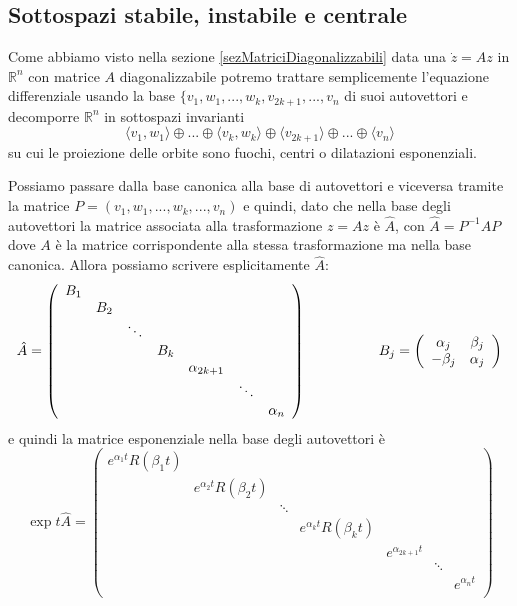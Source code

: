 \documentclass[11pt,a4paper,twoside]{book}
\theoremstyle{esss}
\theoremstyle{dotless}
\numberwithin{equation}{section} %
\begin{document}
\subsection{Sottospazi stabile, instabile e centrale}
Come abbiamo visto nella sezione \ref{sezMatriciDiagonalizzabili} data una $\dot{z}=Az$ in $\mathbb{R}^n$ con matrice $A$ diagonalizzabile potremo trattare semplicemente l'equazione differenziale usando la base $\{v_1,w_1,...,w_k,v_{2k+1},...,v_n$ di suoi autovettori e decomporre $\mathbb{R}^n$ in sottospazi invarianti
\[
\langle v_1,w_1 \rangle \oplus ... \oplus \langle v_k,w_k \rangle \oplus \langle v_{2k+1} \rangle \oplus ... \oplus \langle v_n \rangle
\]
su cui le proiezione delle orbite sono fuochi, centri o dilatazioni esponenziali.

Possiamo passare dalla base canonica alla base di autovettori e viceversa tramite la matrice $P=(v_1,w_1,...,w_k,...,v_n)$ e quindi, dato che nella base degli autovettori la matrice associata alla trasformazione $z=Az$ è $\hat{A}$, con $\hat{A}=P^{-1}AP$ dove $A$ è la matrice corrispondente alla stessa trasformazione ma nella base canonica.
Allora possiamo scrivere esplicitamente $\hat{A}$:
\[ 
\hat{A}=
\left(
\begin{array}{ccccccc}
B_1 &  &  &  &  &  &   \\
 & B_2 &  &  &  &  &   \\
 &  & \ddots &  &  &  &   \\
 &  &  & B_k &  &  &   \\
 &  &  &  &\alpha_{2k+1} &  &   \\
 &  &  &  &  & \ddots &  \\
 &  &  &  &  &  & \alpha_n   \\
\end{array}
\right)
\hspace{0.15\linewidth}
B_j=\left( \begin{array}{cc}
\alpha_j & \beta_j \\
-\beta_j & \alpha_j\\
\end{array}\right)
\]
e quindi la matrice esponenziale nella base degli autovettori è
\[
\exp{t\hat{A}}=
\left(
\begin{array}{ccccccc}
e^{\alpha_1 t}R(\beta_1 t) &  &  &  &  &  &   \\
 & e^{\alpha_2 t}R(\beta_2 t)  &  &  &  &  &   \\
 &  & \ddots &  &  &  &   \\
 &  &  & e^{\alpha_k t}R(\beta_k t)  &  &  &   \\
 &  &  &  & e^{\alpha_{2k+1}t} &  &   \\
 &  &  &  &  & \ddots &  \\
 &  &  &  &  &  & e^{\alpha_n t}   \\
\end{array}
\right)
\]
\end{document}
